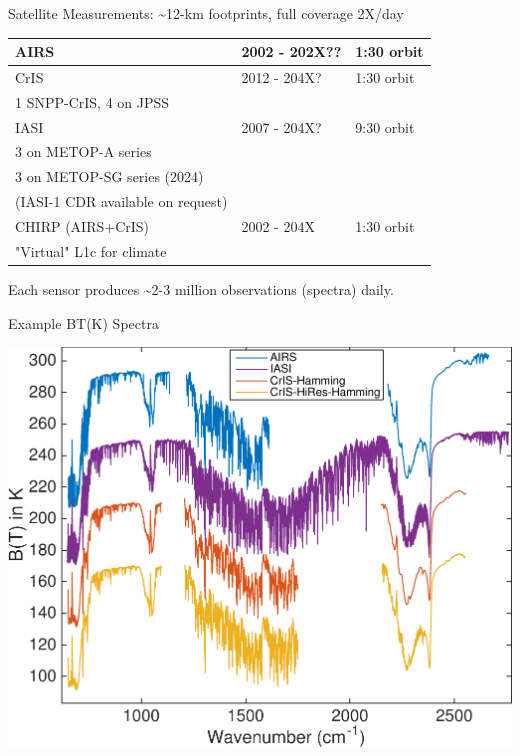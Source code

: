 \documentclass[10pt,t]{beamer}
\begin{document}
\begin{frame}{Satellite Measurements: \small \textasciitilde{}12-km footprints, full coverage 2X/day}
\begin{center}
\begin{tabular}{lll}
AIRS & 2002 - 202X?? & 1:30 orbit\\
\hline
CrIS & 2012 - 204X? & 1:30 orbit\\
\small 1 SNPP-CrIS, 4 on JPSS &  & \\
\hline
IASI & 2007 - 204X? & 9:30 orbit\\
\small 3 on METOP-A series &  & \\
\small 3 on METOP-SG series (2024) &  & \\
\small(IASI-1 CDR available on request) &  & \\
\hline
CHIRP (AIRS+CrIS) & 2002 - 204X & 1:30 orbit\\
\small "Virtual" L1c for climate &  & \\
\end{tabular}
\end{center}

Each sensor produces \textasciitilde{}2-3 million observations (spectra) daily. \\
\vspace{0.1in}
\end{frame}

\begin{frame}{Example BT(K) Spectra}
\begin{center}
\includegraphics[width=0.9\linewidth]{SunClimate2022/hyperall_hamming.pdf}
\end{center}
\end{frame}
\end{document}
